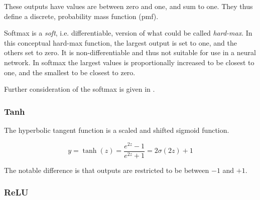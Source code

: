 \documentclass[12pt,parskip]{komatufte}\right
\begin{document}
These outputs have  values are between zero and one, and sum to one.
They thus define a discrete, probability mass function (pmf).

Softmax is a \emph{soft}, i.e. differentiable,  version of what could be called \emph{hard-max}.
In this conceptual hard-max function, the largest output is set to one, and the others set to zero.
It is non-differentiable and thus not suitable for use in a neural network.
In softmax the largest values is proportionally increased to be closest to one,
and the smallest to be closest to zero.

Further consideration of the softmax is given in .

\subsubsection{Tanh}

The hyperbolic tangent function is a  scaled and shifted sigmoid function.

\begin{equation}
y=\tanh(z)=\frac{e^{2z}-1}{e^{2z}+1}=2\sigma(2z)+1
\end{equation}

The notable difference is that outputs are restricted to be between $-1$ and $+1$.

\subsubsection{ReLU}
\end{document}
